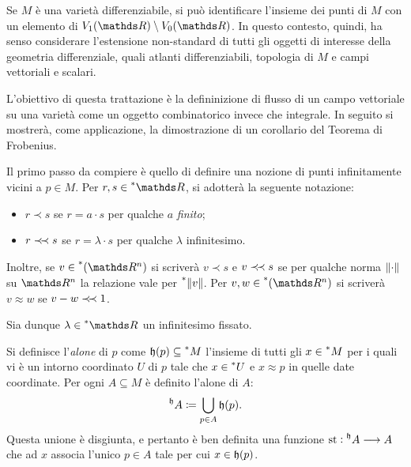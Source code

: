 Se $ M $ è una varietà differenziabile, si può identificare l'insieme dei punti di $ M $ con un elemento di $ V_1(\R)\setminus V_0(\R) $. In questo contesto, quindi, ha senso considerare l'estensione non-standard di tutti gli oggetti di interesse della geometria differenziale, quali atlanti differenziabili, topologia di $ M $ e campi vettoriali e scalari. 

L'obiettivo di questa trattazione è la defininizione di flusso di un campo vettoriale su una varietà come un oggetto combinatorico invece che integrale. In seguito si mostrerà, come applicazione, la dimostrazione di un corollario del Teorema di Frobenius.

Il primo passo da compiere è quello di definire una nozione di punti infinitamente vicini a $ p \in M $. Per $ r, s \in \starR $, si adotterà la seguente notazione: \begin{itemize}
    \item $ r \prec s $ se $ r = a \cdot s $ per qualche $ a $ \emph{finito};
    \item $ r \mathrel{\prec\! \prec} s $ se $ r = \lambda \cdot s $ per qualche $ \lambda $ infinitesimo.
\end{itemize}Inoltre, se $ v \in \nonstandard{(\R^{n})} $ si scriverà $ v\prec s $ e $ v\mathrel{\prec\! \prec} s $ se per qualche norma $ \left\lVert\cdot \right\rVert $ su $ \R^{n} $ la relazione vale per $ \prescript{*}{}{ \left\lVert v\right\rVert } $. Per $ v,w \in \nonstandard{(\R^{n})} $ si scriverà $ v\approx w $ se $ v-w \mathrel{\prec\! \prec} 1$. 

Sia dunque $ \lambda \in \starR $ un infinitesimo fissato.

Si definisce l'\emph{alone} di $ p $ come $ \mathfrak{h}(p) \subseteq \prescript{*}{}{M} $ l'insieme di tutti gli $ x \in \prescript{*}{}{M} $ per i quali vi è un intorno coordinato $ U $ di $ p $ tale che $ x \in \prescript{*}{}{U} $ e $ x \approx p$ in quelle date coordinate. Per ogni $ A \subseteq M $ è definito l'alone di $ A $: \begin{equation*}
    \prescript{\mathfrak{h}}{}{A} \coloneqq \bigcup_{p \in A}\mathfrak{h}(p).
\end{equation*}Questa unione è disgiunta, e pertanto è ben definita una funzione $ \operatorname{st}: \prescript{\mathfrak{h}}{}{A} \longrightarrow A $ che ad $ x $ associa l'unico $ p \in A $ tale per cui $ x \in \mathfrak{h}(p) $.

